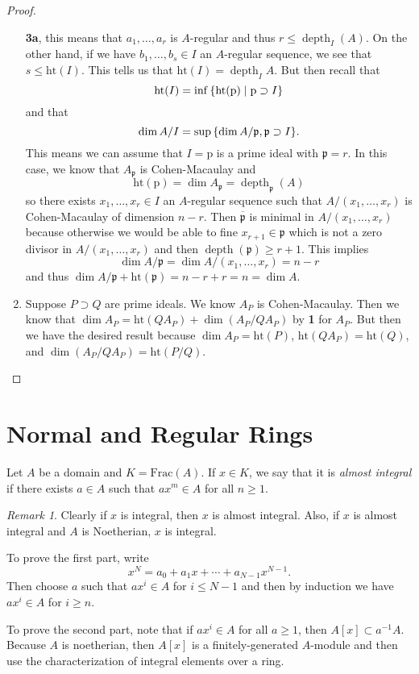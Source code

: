 \documentclass[leqno, openany]{memoir}
\theoremstyle{definition}
\theoremstyle{remark}
\newtheorem{rmk}[thm]{Remark}
\theoremstyle{plain}
\theoremstyle{definition}
\theoremstyle{remark}
\newcommand{\mf}[1]{\mathfrak{#1}}
\newcommand{\mr}[1]{\mathrm{#1}}
\newcommand{\ol}[1]{\overline{#1}}
\DeclareMathOperator{\dpth}{depth}
\begin{document}
\begin{proof}
\begin{enumerate}
        \textbf{3a}, this means that $a_1, \ldots, a_r$ is $A$-regular and thus
        $r \leq \dpth_I (A)$. On the other hand, if we have $b_1, \ldots, b_s
        \in I$ an $A$-regular sequence, we see that $s \leq \mr{ht}(I)$. This
        tells us that $\mr{ht}(I) = \dpth_I A$. But then recall that \[
            \mr{ht}(I) = \inf \qty{\mr{ht}(\mr{p}) \mid \mr{p} \supset I} \]
            and that \[ \dim A/I = \sup \qty{ \dim A/\mf{p}, \mf{p} \supset I
            }. \] This means we can assume that $I = \mr{p}$ is a prime ideal
            with $\mf{p} = r$. In this case, we know that $A_{\mf{p}}$ is
            Cohen-Macaulay and \[ \mr{ht}(\mr{p}) = \dim A_{\mf{p}} =
            \dpth_{\mf{p}} (A) \] so there exists $x_1, \ldots, x_r \in I$ an
            $A$-regular sequence such that $A/(x_1, \ldots, x_r)$ is
            Cohen-Macaulay of dimension $n-r$. Then $\ol{\mf{p}}$ is minimal in
            $A/(x_1, \ldots, x_r)$ because otherwise we would be able to fine
            $x_{r+1} \in \mf{p}$ which is not a zero divisor in $A/(x_1,
            \ldots, x_r)$ and then $\dpth(\mf{p}) \geq r+1$. This implies \[
            \dim A/\mf{p} = \dim A/(x_1, \ldots, x_r) = n-r \] and thus $\dim
            A/\mf{p} + \mr{ht}(\mf{p}) = n-r+r = n = \dim A$.  \item Suppose $P
            \supset Q$ are prime ideals. We know $A_P$ is Cohen-Macaulay. Then
            we know that $\dim A_P = \mr{ht}(QA_P) + \dim (A_P / QA_P)$ by
            \textbf{1} for $A_P$. But then we have the desired result because
            $\dim A_P = \mr{ht}(P)$, $\mr{ht}(Q A_P) = \mr{ht}(Q)$, and $\dim
            (A_P / QA_P) = \mr{ht}(P/Q)$. \qedhere \end{enumerate} \end{proof}


\section{Normal and Regular Rings}%

Let $A$ be a domain and $K = \mr{Frac}(A)$. If $x \in K$, we say that it is
\textit{almost integral} if there exists $a \in A$ such that $ax^m \in A$ for
all $n \geq 1$.

\begin{rmk} Clearly if $x$ is integral, then $x$ is almost integral. Also, if
    $x$ is almost integral and $A$ is Noetherian, $x$ is integral.

    To prove the first part, write \[ x^N = a_0 + a_1 x + \cdots +
    a_{N-1}x^{N-1}. \] Then choose $a$ such that $a x^i \in A$ for $i \leq N-1$
    and then by induction we have $ax^i \in A$ for $i \geq n$.

    To prove the second part, note that if $ax^i \in A$ for all $a \geq 1$,
then $A[x] \subset a^{-1}A$. Because $A$ is noetherian, then $A[x]$ is a
finitely-generated $A$-module and then use the characterization of integral
elements over a ring.  \end{rmk}
\end{document}
